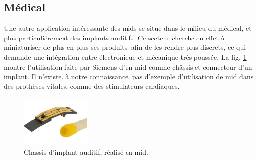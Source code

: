 \subsection{Médical}
Une autre application intéressante des \glspl{mid} se situe dans le milieu du médical, et plus particuliérement des implants auditifs.
Ce secteur cherche en effet à miniaturiser de plus en plus ses produits, afin de les rendre plus discrets, ce qui demande une intégration entre électronique et mécanique très poussée.
La fig. \ref{fig:mid-siemens-example} montre l'utilisation faite par Siemens d'un \gls{mid} comme châssis et connecteur d'un implant.
Il n'existe, à notre connaissance, pas d'exemple d'utilisation de \gls{mid} dans des prothèses vitales, comme des stimulateurs cardiaques.


\begin{figure}[h]
    \begin{center}
        \includegraphics[width=0.3\textwidth]{images/mid-hearing-aid}
        \caption{Chassis d'implant auditif, réalisé en \gls{mid}.}
        \label{fig:mid-siemens-example}
    \end{center}
\end{figure}

